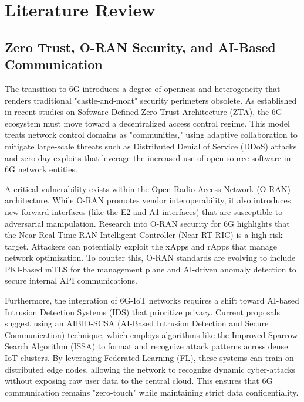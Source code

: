 \documentclass[letterpaper]{article} %
\begin{document}
\section{Literature Review}


\subsection{Zero Trust, O-RAN Security, and AI-Based Communication}

The transition to 6G introduces a degree of openness and heterogeneity that renders traditional "castle-and-moat" security perimeters obsolete. As established in recent studies on Software-Defined Zero Trust Architecture (ZTA), the 6G ecosystem must move toward a decentralized access control regime. This model treats network control domains as "communities," using adaptive collaboration to mitigate large-scale threats such as Distributed Denial of Service (DDoS) attacks and zero-day exploits that leverage the increased use of open-source software in 6G network entities.

A critical vulnerability exists within the Open Radio Access Network (O-RAN) architecture. While O-RAN promotes vendor interoperability, it also introduces new forward interfaces (like the E2 and A1 interfaces) that are susceptible to adversarial manipulation. Research into O-RAN security for 6G highlights that the Near-Real-Time RAN Intelligent Controller (Near-RT RIC) is a high-risk target. Attackers can potentially exploit the xApps and rApps that manage network optimization. To counter this, O-RAN standards are evolving to include PKI-based mTLS for the management plane and AI-driven anomaly detection to secure internal API communications.

Furthermore, the integration of 6G-IoT networks requires a shift toward AI-based Intrusion Detection Systems (IDS) that prioritize privacy. Current proposals suggest using an AIBID-SCSA (AI-Based Intrusion Detection and Secure Communication) technique, which employs algorithms like the Improved Sparrow Search Algorithm (ISSA) to format and recognize attack patterns across dense IoT clusters. By leveraging Federated Learning (FL), these systems can train on distributed edge nodes, allowing the network to recognize dynamic cyber-attacks without exposing raw user data to the central cloud. This ensures that 6G communication remains "zero-touch" while maintaining strict data confidentiality.
\end{document}
